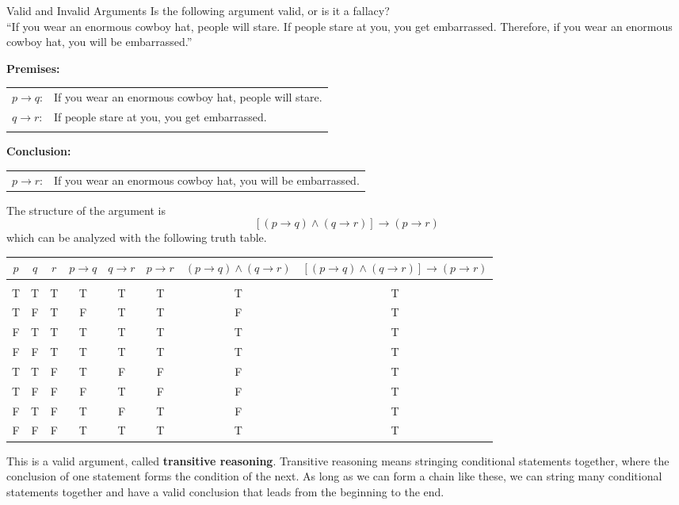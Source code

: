 \begin{example}[https://www.youtube.com/watch?v=0M57bPxQOKg]{Valid and Invalid Arguments}
Is the following argument valid, or is it a fallacy?\\

``If you wear an enormous cowboy hat, people will stare.  If people stare at you, you get embarrassed.  Therefore, if you wear an enormous cowboy hat, you will be embarrassed.''

\sol
\textbf{Premises:}\\
\begin{tabular}{l l}
$p \to q$: & If you wear an enormous cowboy hat, people will stare.\\
$q \to r$: & If people stare at you, you get embarrassed.\\
& \\
\end{tabular}

\textbf{Conclusion:}\\
\begin{tabular}{l l}
$p \to r$: & If you wear an enormous cowboy hat, you will be embarrassed.
\end{tabular}

The structure of the argument is \[[(p \to q) \wedge (q \to r)] \to (p \to r)\]
which can be analyzed with the following truth table.
\begin{center}
{\small
\begin{tabular}{|c c c c c c c c|}
\hline
$p$ & $q$ & $r$ & $p \to q$ & $q \to r$ & $p \to r$ & $(p \to q) \wedge (q \to r)$ & $[(p \to q) \wedge (q \to r)] \to (p \to r)$\\
\hline
& & & & & & & \\
T & T & T & T & T & T & T & T\\
T & F & T & F & T & T & F & T\\
F & T & T & T & T & T & T & T\\
F & F & T & T & T & T & T & T\\
T & T & F & T & F & F & F & T\\
T & F & F & F & T & F & F & T\\
F & T & F & T & F & T & F & T\\
F & F & F & T & T & T & T & T\\
\hline
\end{tabular}}
\end{center}

This is a valid argument, called \textbf{transitive reasoning}.  Transitive reasoning means stringing conditional statements together, where the conclusion of one statement forms the condition of the next.  As long as we can form a chain like these, we can string many conditional statements together and have a valid conclusion that leads from the beginning to the end.
\end{example}
\vfill
\pagebreak

